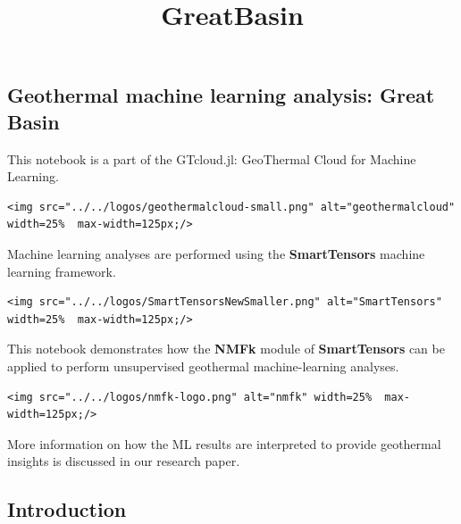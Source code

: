 \documentclass[11pt]{article}
\title{GreatBasin}
\begin{document}
    
    \maketitle
    
    

    
    \hypertarget{geothermal-machine-learning-analysis-great-basin}{%
\subsection{Geothermal machine learning analysis: Great
Basin}\label{geothermal-machine-learning-analysis-great-basin}}

This notebook is a part of the GTcloud.jl: GeoThermal Cloud for Machine
Learning.

\begin{verbatim}
<img src="../../logos/geothermalcloud-small.png" alt="geothermalcloud" width=25%  max-width=125px;/>
\end{verbatim}

Machine learning analyses are performed using the \textbf{SmartTensors}
machine learning framework.

\begin{verbatim}
<img src="../../logos/SmartTensorsNewSmaller.png" alt="SmartTensors" width=25%  max-width=125px;/>
\end{verbatim}

This notebook demonstrates how the \textbf{NMFk} module of
\textbf{SmartTensors} can be applied to perform unsupervised geothermal
machine-learning analyses.

\begin{verbatim}
<img src="../../logos/nmfk-logo.png" alt="nmfk" width=25%  max-width=125px;/>
\end{verbatim}

More information on how the ML results are interpreted to provide
geothermal insights is discussed in our research paper.

    \hypertarget{introduction}{%
\subsection{Introduction}\label{introduction}}
\end{document}
